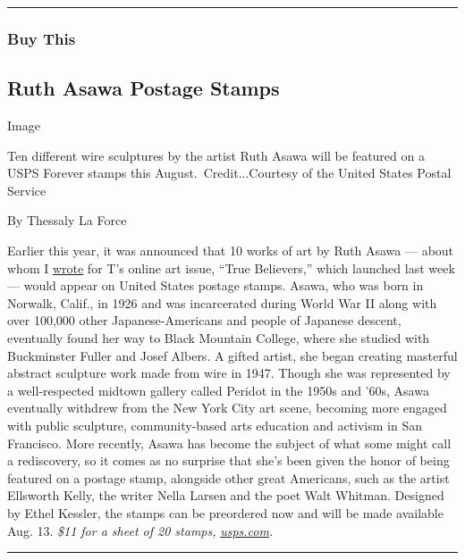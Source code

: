 \begin{center}\rule{0.5\linewidth}{\linethickness}\end{center}

\hypertarget{buy-this}{%
\subsubsection{Buy This}\label{buy-this}}

\hypertarget{ruth-asawa-postage-stamps}{%
\subsection{Ruth Asawa Postage Stamps}\label{ruth-asawa-postage-stamps}}

Image

Ten different wire sculptures by the artist Ruth Asawa will be featured
on a USPS Forever stamps this August.~Credit...Courtesy of the United
States Postal Service

By Thessaly La Force

Earlier this year, it was announced that 10 works of art by Ruth Asawa
--- about whom I
\href{https://www.nytimes3xbfgragh.onion/2020/07/20/t-magazine/ruth-asawa.html}{wrote}
for T's online art issue, ``True Believers,'' which launched last week
--- would appear on United States postage stamps. Asawa, who was born in
Norwalk, Calif., in 1926 and was incarcerated during World War II along
with over 100,000 other Japanese-Americans and people of Japanese
descent, eventually found her way to Black Mountain College, where she
studied with Buckminster Fuller and Josef Albers. A gifted artist, she
began creating masterful abstract sculpture work made from wire in 1947.
Though she was represented by a well-respected midtown gallery called
Peridot in the 1950s and '60s, Asawa eventually withdrew from the New
York City art scene, becoming more engaged with public sculpture,
community-based arts education and activism in San Francisco. More
recently, Asawa has become the subject of what some might call a
rediscovery, so it comes as no surprise that she's been given the honor
of being featured on a postage stamp, alongside other great Americans,
such as the artist Ellsworth Kelly, the writer Nella Larsen and the poet
Walt Whitman. Designed by Ethel Kessler, the stamps can be preordered
now and will be made available Aug. 13. \emph{\$11 for a sheet of 20
stamps,}
\href{https://store.usps.com/store/product/buy-stamps/ruth-asawa-S_476304}{\emph{usps.com}}\emph{.}

\begin{center}\rule{0.5\linewidth}{\linethickness}\end{center}

